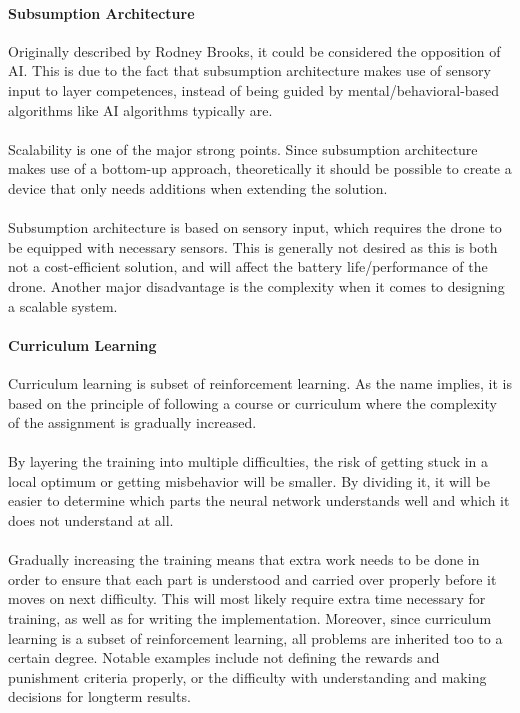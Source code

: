 \paragraph{Subsumption Architecture}
Originally described by Rodney Brooks, it could be considered the opposition of \gls{AI}. This is due to the fact that subsumption architecture makes use of sensory input to layer competences, instead of being guided by mental/behavioral-based algorithms like \gls{AI} algorithms typically are.\cite{subsumption_architecture}
\\\\
Scalability is one of the major strong points. Since subsumption architecture makes use of a bottom-up approach, theoretically it should be possible to create a device that only needs additions when extending the solution.
\\\\
Subsumption architecture is based on sensory input, which requires the drone to be equipped with necessary sensors. This is generally not desired as this is both not a cost-efficient solution, and will affect the battery life/performance of the drone. Another major disadvantage is the complexity when it comes to designing a scalable system.

\paragraph{Curriculum Learning}
Curriculum learning is subset of reinforcement learning. As the name implies, it is based on the principle of following a course or curriculum where the complexity of the assignment is gradually increased.
\\\\
By layering the training into multiple difficulties, the risk of getting stuck in a local optimum or getting misbehavior will be smaller. By dividing it, it will be easier to determine which parts the neural network understands well and which it does not understand at all.
\\\\
Gradually increasing the training means that extra work needs to be done in order to ensure that each part is understood and carried over properly before it moves on next difficulty. This will most likely require extra time necessary for training, as well as for writing the implementation. Moreover, since curriculum learning is a subset of reinforcement learning, all problems are inherited too to a certain degree. Notable examples include not defining the rewards and punishment criteria properly, or the difficulty with understanding and making decisions for longterm results.

